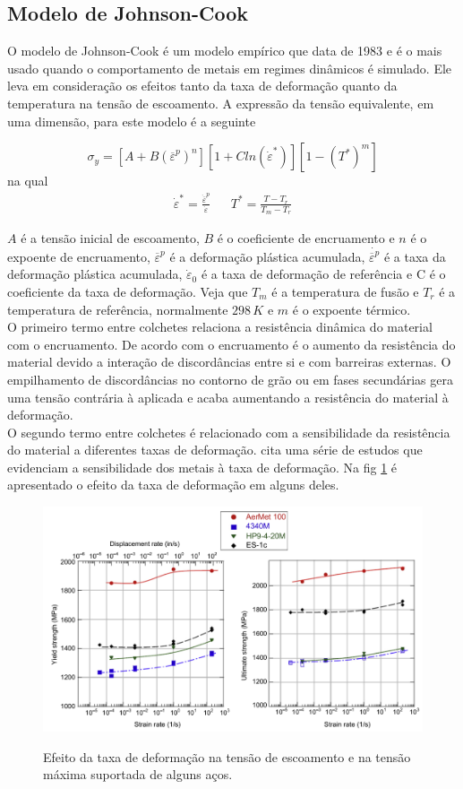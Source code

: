  \subsection{Modelo de Johnson-Cook}
 
 O modelo de Johnson-Cook é um modelo empírico que data de 1983 e é o mais usado quando o comportamento de metais em regimes dinâmicos é simulado. Ele leva em consideração os efeitos tanto da taxa de deformação quanto da temperatura na tensão de escoamento. A expressão da tensão equivalente, em uma dimensão, para este modelo é a seguinte
 
 \begin{equation}
     \sigma_y = [A + B (\overline{\varepsilon}^p)^n][1 + C ln(\dot{\varepsilon}^*)][1-(T^*)^m]
\end{equation}
 na qual 
\begin{align}
     \dot{\varepsilon}^* = \frac{\dot{\overline{\varepsilon}}^p}{\dot{\varepsilon}} &&
     T^* = \frac{T-T_r}{T_m-T_r}
 \end{align}
 
 $A$ é a tensão inicial de escoamento, $ B $ é o coeficiente de encruamento e $ n $ é o expoente de encruamento, $ \overline{\varepsilon}^p $ é a deformação plástica acumulada,  $\dot{ \overline{\varepsilon}^p} $  é a taxa da deformação plástica acumulada, $ \dot{\varepsilon}_0 $ é a taxa de deformação de referência e C é o coeficiente da taxa de deformação. Veja que $ T_m $ é a temperatura de fusão e $ T_r $ 
é a temperatura de referência, normalmente $ 298 \, K $ e $ m $ é o expoente térmico. \\

O primeiro termo entre colchetes relaciona a resistência dinâmica do material com o encruamento. De acordo com \cite{Crouch} o encruamento é o aumento da resistência do material devido a interação de discordâncias entre si e com barreiras externas. O empilhamento de discordâncias no contorno de grão ou em fases secundárias gera uma tensão contrária à aplicada e acaba aumentando a 
resistência do material à deformação. \\

O segundo termo entre colchetes é relacionado com a sensibilidade da resistência do material a diferentes taxas de deformação. \cite{Crouch} cita uma série de estudos que evidenciam a sensibilidade dos metais à taxa de deformação. Na fig \ref{fig:taxadef} é apresentado o efeito da taxa de deformação em alguns deles.

\begin{figure}[H]
    \centering
    \caption{Efeito da taxa de deformação na tensão de escoamento e na tensão máxima suportada de alguns aços.}
    \includegraphics[width=0.5\linewidth]{images/strainrateeffect.png} 
    \label{fig:taxadef}
\end{figure}

